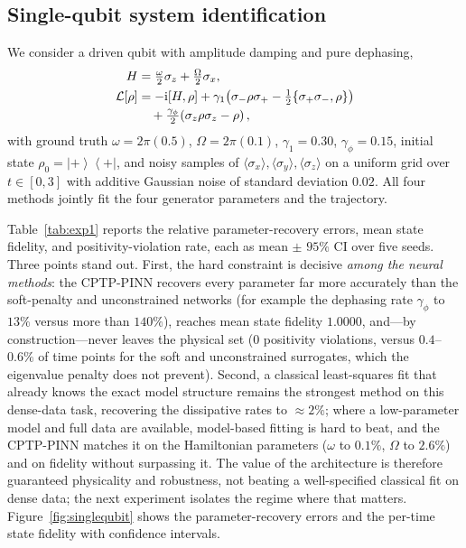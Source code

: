 \documentclass[twocolumn,aps,prxquantum,superscriptaddress,nofootinbib,floatfix,longbibliography]{revtex4-2}
\newcommand{\calL}{\mathcal{L}}
\newcommand{\ii}{\mathrm{i}}
\newcommand{\ket}[1]{\left\lvert #1 \right\rangle}
\newcommand{\bra}[1]{\left\langle #1 \right\rvert}
\begin{document}
\subsection{Single-qubit system identification}
\label{sec:experiment_qubit}

We consider a driven qubit with amplitude damping and pure dephasing,
\begin{align}
    H &= \tfrac{\omega}{2}\sigma_z+\tfrac{\Omega}{2}\sigma_x,\\
    \calL[\rho] &= -\ii[H,\rho]+\gamma_1\!\left(\sigma_-\rho\sigma_+-\tfrac12\{\sigma_+\sigma_-,\rho\}\right)\notag\\
    &\quad+\tfrac{\gamma_\phi}{2}\!\left(\sigma_z\rho\sigma_z-\rho\right),
\end{align}
with ground truth $\omega=2\pi(0.5)$, $\Omega=2\pi(0.1)$, $\gamma_1=0.30$, $\gamma_\phi=0.15$, initial state $\rho_0=\ket{+}\bra{+}$, and noisy samples of $\langle\sigma_x\rangle,\langle\sigma_y\rangle,\langle\sigma_z\rangle$ on a uniform grid over $t\in[0,3]$ with additive Gaussian noise of standard deviation $0.02$. All four methods jointly fit the four generator parameters and the trajectory.

Table~\ref{tab:exp1} reports the relative parameter-recovery errors, mean state fidelity, and positivity-violation rate, each as mean $\pm$ $95\%$ CI over five seeds. Three points stand out. First, the hard constraint is decisive \emph{among the neural methods}: the CPTP-PINN recovers every parameter far more accurately than the soft-penalty and unconstrained networks (for example the dephasing rate $\gamma_\phi$ to $13\%$ versus more than $140\%$), reaches mean state fidelity $1.0000$, and---by construction---never leaves the physical set ($0$ positivity violations, versus $0.4$--$0.6\%$ of time points for the soft and unconstrained surrogates, which the eigenvalue penalty does not prevent). Second, a classical least-squares fit that already knows the exact model structure remains the strongest method on this dense-data task, recovering the dissipative rates to $\approx2\%$; where a low-parameter model and full data are available, model-based fitting is hard to beat, and the CPTP-PINN matches it on the Hamiltonian parameters ($\omega$ to $0.1\%$, $\Omega$ to $2.6\%$) and on fidelity without surpassing it. The value of the architecture is therefore guaranteed physicality and robustness, not beating a well-specified classical fit on dense data; the next experiment isolates the regime where that matters. Figure~\ref{fig:singlequbit} shows the parameter-recovery errors and the per-time state fidelity with confidence intervals.
\end{document}
